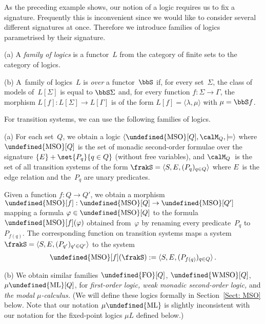 \documentclass[10pt, fleqn]{scrartcl}
\makeatletter
\newcommand\m@thsm@ller[2]{\mbox{\relscale{0.91}$\m@th#1#2$}}
\let\smaller\undefined
\DeclareRobustCommand\smaller[1]{\relax\ifmmode{\mathpalette\m@thsm@ller{#1}}\else{\relscale{0.91}#1}\fi}
\newcommand*{\ML}{\smaller{\mathrm{ML}}}
\newcommand*{\WMSO}{\smaller{\mathrm{WMSO}}}
\newcommand*{\MSO}{\smaller{\mathrm{MSO}}}
\newcommand*{\FO}{\smaller{\mathrm{FO}}}
\newcommand*{\?}{\kern .08em}
\makeatother
\begin{document}
As the preceding example shows, our notion of a logic requires us to fix a signature.
Frequently this is inconvenient since we would like to consider several different signatures
at once. Therefore we introduce families of logics parametrised by their signature.
\begin{Def}
(a) A \emph{family of logics} is a functor~$L$ from the category of finite sets to the
category of logics.

(b)
A~family of logics~$L$ is \emph{over} a functor~$\bbS$ if, for every set~$\Sigma$,
the class of models of~$L[\Sigma]$ is equal to $\bbS\Sigma$ and,
for every function $f : \Sigma \to \Gamma$, the morphism $L[f] : L[\Sigma] \to L[\Gamma]$
is of the form $L[f] = \langle\lambda,\mu\rangle$ with $\mu = \bbS f$.
\end{Def}
\begin{Exams}
For transition systems, we can use the following families of logics.

(a)
For each set~$Q$, we obtain a logic $\langle\MSO[Q],\calM_Q,{\models}\rangle$
where $\MSO[Q]$ is the set of monadic second-order formulae over the signature
$\{ E \} + \set{ P_q }{ q \in Q }$ (without free variables),
and $\calM_Q$~is the set of all transition systems of the form
$\frakS = \langle S,E,(P_q)_{q \in Q}\rangle$ where $E$~is the edge relation
and the~$P_q$ are unary predicates.

Given a function $f : Q \to Q'$, we obtain a morphism $\MSO[f] : \MSO[Q] \to \MSO[Q']$
mapping a formula $\varphi \in \MSO[Q]$ to the formula $\MSO[f](\varphi)$
obtained from~$\varphi$ by renaming every predicate~$P_q$ to~$P_{f(q)}$.
The corresponding function on transition systems maps a system
$\frakS = \langle S,E,(P_{q'})_{q' \in Q'}\rangle$ to the system
\begin{align*}
  \MSO[f](\frakS) := \langle S,E,(P_{f(q)})_{q \in Q}\rangle\,.
\end{align*}

(b) We obtain similar families $\FO[Q]$, $\WMSO[Q]$, $\mu\ML[Q]$,
for \emph{first-order logic, weak monadic second-order logic,} and
\emph{the modal $\mu$-calculus.}
(We will define these logics formally in Section~\ref{Sect: MSO} below.
Note that our notation $\mu\ML$ is slightly inconsistent with our notation
for the fixed-point logics $\mu L$ defined below.)
\end{Exams}
\end{document}
